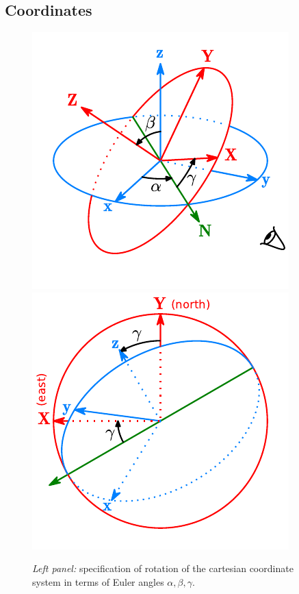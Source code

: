 \documentclass[12pt]{article}
\begin{document}
\subsection{Coordinates}  \label{sec:CoordinateDetails}

\begin{figure}
\begin{center}
\includegraphics{EulerAngles.pdf} \hspace{1cm}
\includegraphics{EulerAnglesProjection.pdf}
\end{center}
\caption{\textit{Left panel:} specification of rotation of the cartesian coordinate system in terms of Euler angles $\alpha,\beta,\gamma$.\protect\\
}
\end{figure}
\end{document}
